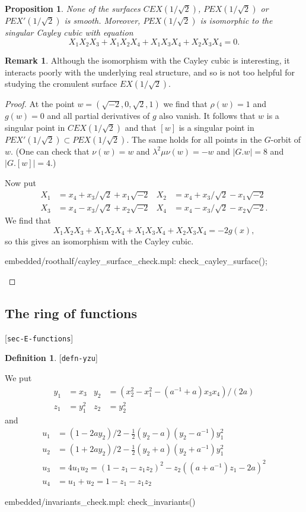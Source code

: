 \documentclass[reqno]{amsart}
\newcommand{\lbl}[1]{\label{#1}\textup{[\texttt{#1}]}\par}
\newcommand{\lbl}{\label}
\newcommand{\lm}        {\lambda}
\newcommand{\half}      {\tfrac{1}{2}}
\newcommand{\rt}        {\sqrt{2}}
\renewcommand{\:}{\colon}
\newtheorem{proposition}[theorem]{Proposition}
\theoremstyle{definition}
\newtheorem{remark}[theorem]{Remark}
\newtheorem{definition}[theorem]{Definition}
\begin{document}
\begin{proposition}
 None of the surfaces $CEX(1/\rt)$, $PEX(1/\rt)$ or $PEX'(1/\rt)$ is
 smooth.  Moreover, $PEX(1/\rt)$ is isomorphic to the singular Cayley
 cubic with equation
 \[ X_1X_2X_3 + X_1X_2X_4 + X_1X_3X_4 + X_2X_3X_4 = 0. \]
\end{proposition}
\begin{remark}
 Although the isomorphism with the Cayley cubic is interesting, it
 interacts poorly with the underlying real structure, and so is not
 too helpful for studying the cromulent surface $EX(1/\rt)$.
\end{remark}
\begin{proof}
 At the point $w=(\sqrt{-2},0,\rt,1)$ we find that $\rho(w)=1$ and
 $g(w)=0$ and all partial derivatives of $g$ also vanish.  It follows
 that $w$ is a singular point in $CEX(1/\rt)$ and that $[w]$ is a
 singular point in $PEX'(1/\rt)\subset PEX(1/\rt)$.  The same holds
 for all points in the $G$-orbit of $w$.  (One can check that
 $\nu(w)=w$ and $\lm^2\mu\nu(w)=-w$ and $|G.w|=8$ and $|G.[w]|=4$.)

 Now put
 \begin{align*}
  X_1 &= x_4 + x_3/\rt + x_1\sqrt{-2} &
  X_2 &= x_4 + x_3/\rt - x_1\sqrt{-2} \\
  X_3 &= x_4 - x_3/\rt + x_2\sqrt{-2} &
  X_4 &= x_4 - x_3/\rt - x_2\sqrt{-2}.
 \end{align*}
 We find that
 \[ X_1X_2X_3 + X_1X_2X_4 + X_1X_3X_4 + X_2X_3X_4 = -2g(x), \]
 so this gives an isomorphism with the Cayley cubic.
 \begin{checks}
  embedded/roothalf/cayley_surface_check.mpl: check_cayley_surface();
 \end{checks}
\end{proof}

\subsection{The ring of functions}
\lbl{sec-E-functions}

\begin{definition}\lbl{defn-yzu}
 We put
 \begin{align*}
  y_1 &= x_3   & y_2 &= (x_2^2 - x_1^2 - (a^{-1}+a)x_3x_4)/(2a) \\
  z_1 &= y_1^2 & z_2 &= y_2^2
 \end{align*}
 and
 \begin{align*}
  u_1 &= (1-2ay_2)/2 - \half(y_2-a)(y_2-a^{-1})y_1^2 \\
  u_2 &= (1+2ay_2)/2 - \half(y_2+a)(y_2+a^{-1})y_1^2 \\
  u_3 &= 4u_1u_2
       = (1-z_1-z_1z_2)^2 - z_2((a+a^{-1})z_1-2a)^2 \\
  u_4 &= u_1+u_2 = 1 - z_1 - z_1z_2
 \end{align*}
\end{definition}
\begin{checks}
 embedded/invariants_check.mpl: check_invariants()
\end{checks}
\end{document}
